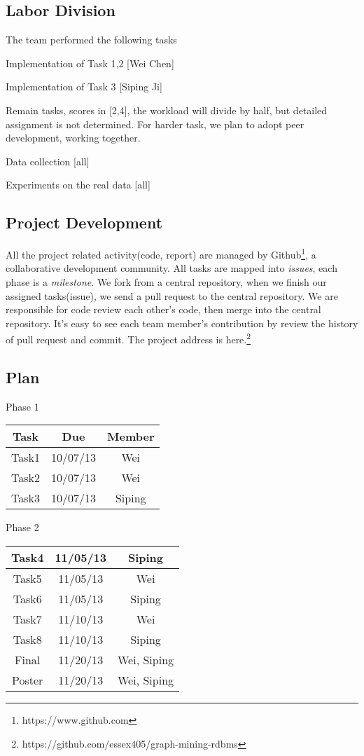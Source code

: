 
\subsection{Labor Division}

The team performed the following tasks
\bit
\item Implementation of Task 1,2 [Wei Chen]
\item Implementation of Task 3 [Siping Ji]
\item Remain tasks, scores in [2,4], the workload will divide by half, but detailed assignment is not determined. For harder task, we plan to adopt peer development, working together. 
\item Data collection [all]
\item Experiments on the real data [all]
\eit

\subsection{Project Development}
All the project related activity(code, report) are managed by Github\footnote{https://www.github.com}, a collaborative development community. All tasks are mapped into \emph{issues}, each phase is a \emph{milestone}. We fork from a central repository, when we finish our assigned tasks(issue), we send a pull request to the central repository. We are responsible for code review each other's code, then merge into the central repository. It's easy to see each team member's contribution by review the history of pull request and commit. The project address is here.\footnote{https://github.com/essex405/graph-mining-rdbms}

\subsection{Plan}

\begin{center}
Phase 1\\
\begin{tabular}{|c|c|c|}
\hline
Task & Due & Member \\\hline
Task1 & 10/07/13 & Wei\\\hline
Task2 & 10/07/13 & Wei\\\hline
Task3 & 10/07/13 & Siping\\\hline
\end{tabular}
\end{center}

\begin{center}
Phase 2\\
\begin{tabular}{|c|c|c|}
\hline
Task4 & 11/05/13 & Siping\\\hline
Task5 & 11/05/13 & Wei\\\hline
Task6 & 11/05/13 & Siping\\\hline
Task7 & 11/10/13 & Wei\\\hline
Task8 & 11/10/13 & Siping\\\hline
Final & 11/20/13 & Wei, Siping\\\hline
Poster & 11/20/13 & Wei, Siping\\\hline
\end{tabular}
\end{center}

